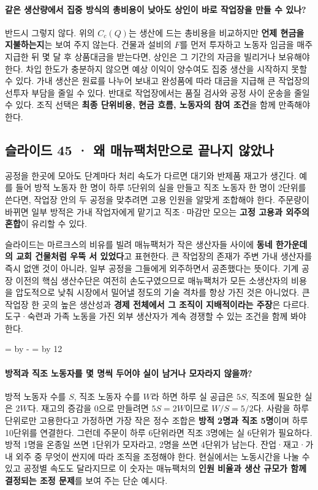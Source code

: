 \documentclass[10pt,a4paper]{article}
\newcommand{\ReserveQuestionSpace}{%
  \par\begingroup
  \dimen0=\pagegoal \advance\dimen0 by -\pagetotal
  \dimen2=\baselineskip \multiply\dimen2 by 12
  \ifdim\dimen0<\dimen2 \newpage\fi
  \endgroup}
\begin{document}
\paragraph{같은 생산량에서 집중 방식의 총비용이 낮아도 상인이 바로 작업장을 만들 수 있나?}
반드시 그렇지 않다. 위의 $C_c(Q)$는 생산에 드는 총비용을 비교하지만 \textbf{언제 현금을 지불하는지}는 보여 주지 않는다. 건물과 설비의 $F$를 먼저 투자하고 노동자 임금을 매주 지급한 뒤 몇 달 후 상품대금을 받는다면, 상인은 그 기간의 자금을 빌리거나 보유해야 한다. 차입 한도가 충분하지 않으면 예상 이익이 양수여도 집중 생산을 시작하지 못할 수 있다. 가내 생산은 원료를 나누어 보내고 완성품에 따라 대금을 지급해 큰 작업장의 선투자 부담을 줄일 수 있다. 반대로 작업장에서는 품질 검사와 공정 사이 운송을 줄일 수 있다. 조직 선택은 \textbf{최종 단위비용, 현금 흐름, 노동자의 참여 조건}을 함께 만족해야 한다.\par

\subsection{슬라이드 45 · 왜 매뉴팩처만으로 끝나지 않았나}
공정을 한곳에 모아도 단계마다 처리 속도가 다르면 대기와 반제품 재고가 생긴다. 예를 들어 방적 노동자 한 명이 하루 5단위의 실을 만들고 직조 노동자 한 명이 2단위를 쓴다면, 작업장 안의 두 공정을 맞추려면 고용 인원을 알맞게 조합해야 한다. 주문량이 바뀌면 일부 방적은 가내 작업자에게 맡기고 직조·마감만 모으는 \textbf{고정 고용과 외주의 혼합}이 유리할 수 있다.\par

슬라이드는 마르크스의 비유를 빌려 매뉴팩처가 작은 생산자들 사이에 \textbf{동네 한가운데의 교회 건물처럼 우뚝 서 있었다}고 표현한다. 큰 작업장의 존재가 주변 가내 생산자를 즉시 없앤 것이 아니라, 일부 공정을 그들에게 외주하면서 공존했다는 뜻이다. 기계 공장 이전의 핵심 생산수단은 여전히 손도구였으므로 매뉴팩처가 모든 소생산자의 비용을 압도적으로 낮춰 시장에서 밀어낼 정도의 기술 격차를 항상 가진 것은 아니었다. 큰 작업장 한 곳의 높은 생산성과 \textbf{경제 전체에서 그 조직이 지배적이라는 주장}은 다르다. 도구·숙련과 가족 노동을 가진 외부 생산자가 계속 경쟁할 수 있는 조건을 함께 봐야 한다.\par

\ReserveQuestionSpace
\paragraph{방적과 직조 노동자를 몇 명씩 두어야 실이 남거나 모자라지 않을까?}

방적 노동자 수를 $S$, 직조 노동자 수를 $W$라 하면 하루 실 공급은 $5S$, 직조에 필요한 실은 $2W$다. 재고의 증감을 0으로 만들려면 $5S=2W$이므로 $W/S=5/2$다. 사람을 하루 단위로만 고용한다고 가정하면 가장 작은 정수 조합은 \textbf{방적 2명과 직조 5명}이며 하루 10단위를 연결한다. 그런데 주문이 하루 6단위라면 직조 3명에는 실 6단위가 필요하다. 방적 1명을 온종일 쓰면 1단위가 모자라고, 2명을 쓰면 4단위가 남는다. 잔업·재고·가내 외주 중 무엇이 싼지에 따라 조직을 조정해야 한다. 현실에서는 노동시간을 나눌 수 있고 공정별 속도도 달라지므로 이 숫자는 매뉴팩처의 \textbf{인원 비율과 생산 규모가 함께 결정되는 조정 문제}를 보여 주는 단순 예시다.\par
\end{document}
